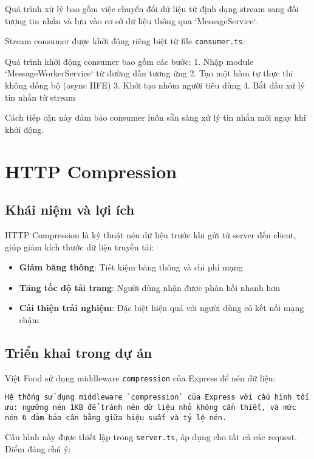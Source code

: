Quá trình xử lý bao gồm việc chuyển đổi dữ liệu từ định dạng stream sang đối tượng tin nhắn và lưu vào cơ sở dữ liệu thông qua `MessageService`.

Stream consumer được khởi động riêng biệt từ file \texttt{consumer.ts}:

Quá trình khởi động consumer bao gồm các bước:
1. Nhập module `MessageWorkerService` từ đường dẫn tương ứng
2. Tạo một hàm tự thực thi không đồng bộ (async IIFE)
3. Khởi tạo nhóm người tiêu dùng
4. Bắt đầu xử lý tin nhắn từ stream

Cách tiếp cận này đảm bảo consumer luôn sẵn sàng xử lý tin nhắn mới ngay khi khởi động.

\section{HTTP Compression}

\subsection{Khái niệm và lợi ích}
HTTP Compression là kỹ thuật nén dữ liệu trước khi gửi từ server đến client, giúp giảm kích thước dữ liệu truyền tải:

\begin{itemize}
    \item \textbf{Giảm băng thông}: Tiết kiệm băng thông và chi phí mạng
    \item \textbf{Tăng tốc độ tải trang}: Người dùng nhận được phản hồi nhanh hơn
    \item \textbf{Cải thiện trải nghiệm}: Đặc biệt hiệu quả với người dùng có kết nối mạng chậm
\end{itemize}

\subsection{Triển khai trong dự án}
Việt Food sử dụng middleware \texttt{compression} của Express để nén dữ liệu:

\begin{verbatim}
Hệ thống sử dụng middleware `compression` của Express với cấu hình tối ưu: ngưỡng nén 1KB để tránh nén dữ liệu nhỏ không cần thiết, và mức nén 6 đảm bảo cân bằng giữa hiệu suất và tỷ lệ nén.
\end{verbatim}

Cấu hình này được thiết lập trong \texttt{server.ts}, áp dụng cho tất cả các request. Điểm đáng chú ý:



